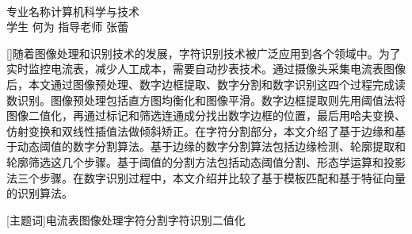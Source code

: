 \begin{center}
\thesistitle\\[1ex]
专业名称\quad 计算机科学与技术\\[1ex]
学生 \quad 何为 \quad 指导老师 \quad 张蕾\\[2ex]
\end{center}\par

{[{}]随着图像处理和识别技术的发展，字符识别技术被广泛应用到各个领域中。为了实时监控电流表，减少人工成本，需要自动抄表技术。通过摄像头采集电流表图像后，本文通过图像预处理、数字边框提取、数字分割和数字识别这四个过程完成读数识别。图像预处理包括直方图均衡化和图像平滑。数字边框提取则先用阈值法将图像二值化，再通过标记和筛选连通成分找出数字边框的位置，最后用哈夫变换、仿射变换和双线性插值法做倾斜矫正。在字符分割部分，本文介绍了基于边缘和基于动态阈值的数字分割算法。基于边缘的数字分割算法包括边缘检测、轮廓提取和轮廓筛选这几个步骤。基于阈值的分割方法包括动态阈值分割、形态学运算和投影法三个步骤。在数字识别过程中，本文介绍并比较了基于模板匹配和基于特征向量的识别算法。}

[{\heiti 主题词}]{\kaishu 电流表\quad 图像处理\quad 字符分割\quad 字符识别\quad 二值化\quad}







